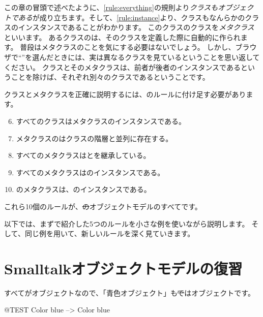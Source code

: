 \documentclass[a4paper,10pt,twoside]{book}
\begin{document}
この章の冒頭で述べたように、\ref{rule:everything}の規則より\emph{クラスもオブジェクトである}が成り立ちます。そして、\ref{rule:instance}より、クラスもなんらかのクラスのインスタンスであることがわかります。
このクラスのクラスを\emph{メタクラス}といいます。
あるクラスのは、そのクラスを定義した際に自動的に作られます。
普段はメタクラスのことを気にする必要はないでしょう。
しかし、ブラウザで``''を選んだときには、実は異なるクラスを見ているということを思い返してください。
クラスとそのメタクラスは、前者が後者のインスタンスであるということを除けば、それぞれ別々のクラスであるということです。

クラスとメタクラスを正確に説明するには、のルールに付け足す必要があります。

\begin{enumerate}[label={\textbf{Rule \arabic{*}}.}, ref={Rule \arabic{*}}, leftmargin=*, widest=10]
\setcounter{enumi}{5}
\item{} 
	すべてのクラスはメタクラスのインスタンスである。

\item{} 
	メタクラスのはクラスの階層と並列に存在する。

\item{} 
	すべてのメタクラスはとを継承している。

\item{} 
	すべてのメタクラスはのインスタンスである。

\item{} 
	のメタクラスは、のインスタンスである。

\end{enumerate}

\noindent
これら10個のルールが、\st のオブジェクトモデルのすべてです。

以下では、まずで紹介した5つのルールを小さな例を使いながら説明します。
そして、同じ例を用いて、新しいルールを深く見ていきます。

\section{Smalltalkオブジェクトモデルの復習}

すべてがオブジェクトなので、「青色オブジェクト」も\st ではオブジェクトです。
\begin{code}{@TEST}
Color blue --> Color blue
\end{code}
\end{document}
